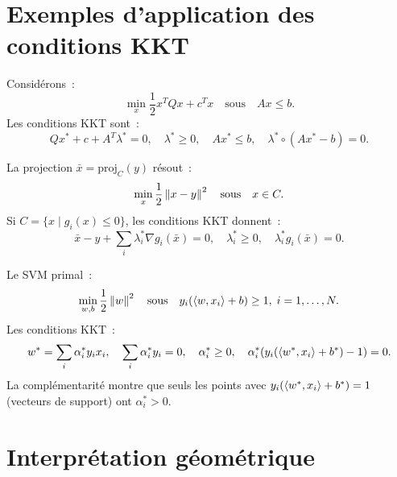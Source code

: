\section{Exemples d'application des conditions KKT}

\begin{exemple}
Consid\'erons~:
\[
    \min_x \frac{1}{2}x^TQx + c^Tx \quad \text{sous} \quad Ax \leq b.
\]
Les conditions KKT sont~:
\[
    Qx^* + c + A^T\lambda^* = 0, \quad \lambda^* \geq 0, \quad
    A x^* \leq b, \quad \lambda^* \circ (Ax^* - b) = 0.
\]
\end{exemple}

\begin{exemple}
La projection $\bar{x} = \mathrm{proj}_C(y)$ r\'esout~:
\[
    \min_x \frac{1}{2}\left\| x - y \right\|^2 \quad \text{sous} \quad x \in C.
\]
Si $C = \{x \mid g_i(x) \leq 0\}$, les conditions KKT donnent~:
\[
    \bar{x} - y + \sum_i \lambda_i^* \nabla g_i(\bar{x}) = 0, \quad
    \lambda_i^* \geq 0, \quad \lambda_i^* g_i(\bar{x}) = 0.
\]
\end{exemple}

\begin{exemple}
Le SVM primal~:
\[
    \min_{w,b} \frac{1}{2}\left\| w \right\|^2 \quad \text{sous} \quad
    y_i(\langle w, x_i \rangle + b) \geq 1, \; i=1,\ldots,N.
\]
Les conditions KKT~:
\[
    w^* = \sum_i \alpha_i^* y_i x_i, \quad
    \sum_i \alpha_i^* y_i = 0, \quad
    \alpha_i^* \geq 0, \quad
    \alpha_i^*(y_i(\langle w^*, x_i \rangle + b^*) - 1) = 0.
\]
La compl\'ementarit\'e montre que seuls les points avec $y_i(\langle w^*, x_i \rangle + b^*) = 1$
(vecteurs de support) ont $\alpha_i^* > 0$.
\end{exemple}

\section{Interpr\'etation g\'eom\'etrique}

\begin{center}
\end{center}

